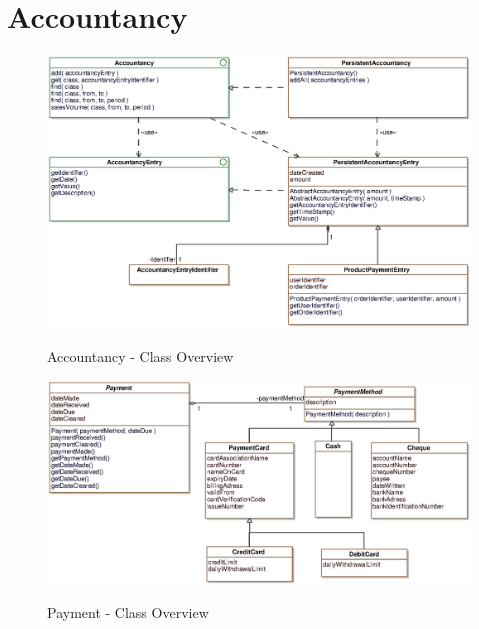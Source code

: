 \section{Accountancy}

\begin{figure}[ht]
	\centering
  \includegraphics[width=1.0\textwidth]{images/Accountancy_Overview.eps}
	\label{accountancy_overview}
	\caption{Accountancy - Class Overview}
\end{figure}

\begin{figure}[ht]
	\centering
  \includegraphics[width=1.0\textwidth]{images/Payment_Overview.eps}
	\label{payment_overview}
	\caption{Payment - Class Overview}
\end{figure}
